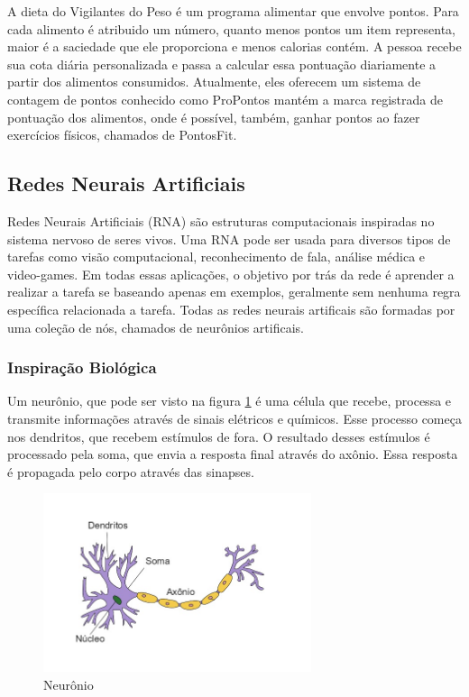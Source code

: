 A dieta do Vigilantes do Peso \cite{vigilantes_do_peso} é um programa alimentar que envolve pontos. Para cada alimento é atribuido um número, quanto menos pontos um item representa, maior é a saciedade que ele proporciona e menos calorias contém. A pessoa recebe sua cota diária personalizada e passa a calcular essa pontuação diariamente a partir dos alimentos consumidos. Atualmente, eles oferecem um sistema de contagem de pontos conhecido como ProPontos mantém a marca registrada de pontuação dos alimentos, onde é possível, também, ganhar pontos ao fazer exercícios físicos, chamados de PontosFit.

\newpage
\subsection{Redes Neurais Artificiais\label{subsec:nn}}

Redes Neurais Artificiais (RNA) são estruturas computacionais inspiradas no sistema nervoso de seres vivos. Uma RNA pode ser usada para diversos tipos de tarefas como visão computacional, reconhecimento de fala, análise médica e video-games. Em todas essas aplicações, o objetivo por trás da rede é aprender a realizar a tarefa se baseando apenas em exemplos, geralmente sem nenhuma regra específica relacionada a tarefa. Todas as redes neurais artificais são formadas por uma coleção de nós, chamados de neurônios artificais.

\subsubsection{Inspiração Biológica}

Um neurônio, que pode ser visto na figura \ref{fig:neuron} é uma célula que recebe, processa e transmite informações através de sinais elétricos e químicos. Esse processo começa nos dendritos, que recebem estímulos de fora. O resultado desses estímulos é processado pela soma, que envia a resposta final através do axônio. Essa resposta é propagada pelo corpo através das sinapses.

\begin{figure}[!ht]
\centering 
\caption{Neurônio}
\label{fig:neuron}
\includegraphics[width=0.7\textwidth]{imgs/neuronio.jpg}
\end{figure}

